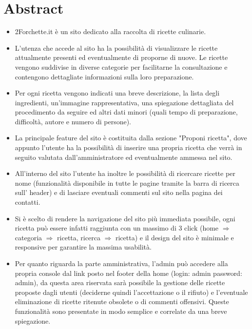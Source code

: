\documentclass[12pt]{article}
\begin{document}
	\section{Abstract}
	\begin{itemize}
		\item 2Forchette.it \`e un sito dedicato alla raccolta di ricette culinarie. 
		\item L'utenza che accede al sito ha la possibilit\`a di visualizzare le ricette attualmente presenti ed eventualmente di proporne di nuove. Le ricette vengono suddivise in diverse categorie per facilitarne la consultazione e contengono dettagliate informazioni sulla loro preparazione.

		\item Per ogni ricetta vengono indicati una breve descrizione, la lista degli ingredienti, un'immagine rappresentativa, una spiegazione dettagliata del procedimento da seguire ed altri dati minori (quali tempo di preparazione, difficoltà, autore e numero di persone).

		\item La principale feature del sito \`e costituita dalla sezione "Proponi ricetta", dove appunto l'utente ha la possibilit\`a di inserire una propria ricetta che verr\`a in seguito valutata dall'amministratore ed eventualmente ammessa nel sito.

		\item All'interno del sito l'utente ha inoltre le possibilit\`a di ricercare ricette per nome (funzionalit\`a disponibile in tutte le pagine tramite la barra di ricerca sull' header) e di lasciare eventuali commenti sul sito nella pagina dei contatti.

		\item Si \`e scelto di rendere la navigazione del sito più immediata possibile, ogni ricetta può essere infatti raggiunta con un massimo di 3 click (home $\Rightarrow$ categoria $\Rightarrow$ ricetta, ricerca $\Rightarrow$ ricetta) e il design del sito è minimale e responsive per garantire la massima usabilit\`a.


		\item Per quanto riguarda la parte amministrativa, l'admin pu\`o accedere alla propria console dal link posto nel footer della home (login: admin password: admin), da questa area riservata sar\`a possibile la gestione delle ricette proposte dagli utenti (deciderne quindi l'accettazione o il rifiuto) e l'eventuale eliminazione di ricette ritenute obsolete o di commenti offensivi. Queste funzionalit\`a sono presentate in modo semplice e correlate da una breve spiegazione.
	\end{itemize}
\end{document}
